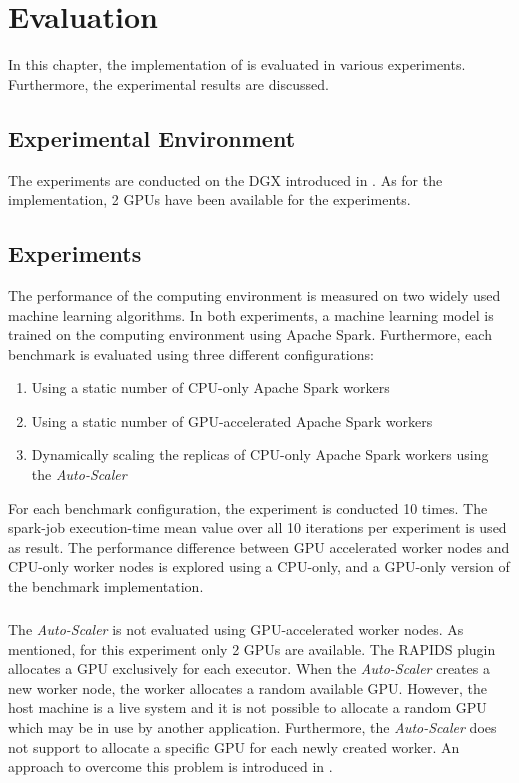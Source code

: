 \chapter{Evaluation}
\label{chap:07_evaluation}

In this chapter, the implementation of  is evaluated in various experiments. Furthermore, the experimental results are discussed.

\section{Experimental Environment}
%
The experiments are conducted on the DGX introduced in .
As for the implementation, 2 GPUs have been available for the experiments.


\section{Experiments}
The performance of the computing environment is measured on two widely used machine learning algorithms.
In both experiments, a machine learning model is trained on the computing environment using Apache Spark. Furthermore, each benchmark is evaluated using three different configurations:
\begin{enumerate}
\item Using a static number of CPU-only Apache Spark workers
\item Using a static number of GPU-accelerated Apache Spark workers
\item Dynamically scaling the replicas of CPU-only Apache Spark workers using the \textit{Auto-Scaler}
\end{enumerate}
For each benchmark configuration, the experiment is conducted 10 times. The spark-job execution-time mean value over all 10 iterations per experiment is used as result.
The performance difference between GPU accelerated worker nodes and CPU-only worker nodes is explored using a CPU-only, and a GPU-only version of the benchmark implementation.

\paragraph{}
The \textit{Auto-Scaler} is not evaluated using GPU-accelerated worker nodes. As mentioned, for this experiment only 2 GPUs are available. The RAPIDS plugin allocates a GPU exclusively for each executor. When the \textit{Auto-Scaler} creates a new worker node, the worker allocates a random available GPU.
However, the host machine is a live system and it is not possible to allocate a random GPU which may be in use by another application. Furthermore, the \textit{Auto-Scaler} does not support to allocate a specific GPU for each newly created worker. An approach to overcome this problem is introduced in .

